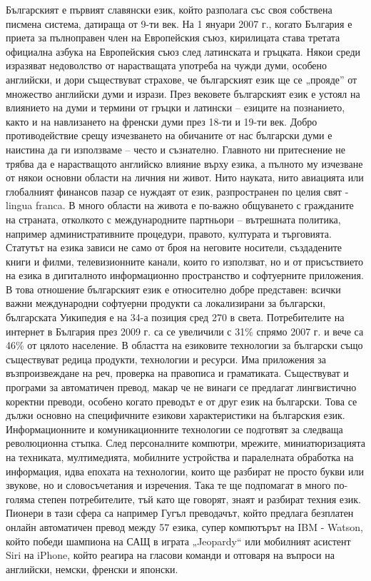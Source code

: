 \begin{multicols}{2}
Българският е първият славянски език, който разполага със своя собствена писмена система, датираща от 9-ти век. На 1 януари 2007 г., когато България е приета за пълноправен член на Европейския съюз, кирилицата става третата официална азбука на Европейския съюз след латинската и гръцката. 
Някои среди изразяват недоволство от нарастващата употреба на чужди думи, особено английски, и дори съществуват страхове, че българският език ще се „прояде” от множество английски думи и изрази. През вековете българският език е устоял на влиянието на думи и термини от гръцки и латински – езиците на познанието, както и на навлизането на френски думи през 18-ти и 19-ти век. Добро противодействие срещу изчезването на обичаните от нас български думи е наистина да ги използваме – често и съзнателно.
Главното ни притеснение не трябва да е нарастващото английско влияние върху езика, а пълното му изчезване от някои основни области на личния ни живот. Нито науката, нито авиацията или глобалният финансов пазар се нуждаят от език, разпространен по целия свят -  lingua franca. В много области на живота е по-важно общуването с гражданите на страната, отколкото с международните партньори – вътрешната политика, например административните процедури, правото, културата и търговията. Статутът на езика зависи не само от броя на неговите носители, създадените книги и филми, телевизионните канали, които го използват, но и от присъствието на езика в дигиталното информационно пространство и софтуерните приложения.
В това отношение българският език е относително добре представен: всички важни международни софтуерни продукти са локализирани за български, българската Уикипедия е на 34-а  позиция сред 270 в света. Потребителите на интернет в България през 2009 г. са се увеличили с 31\% спрямо 2007 г. и вече са 46\% от цялото население.
В областта на езиковите технологии за български също съществуват редица продукти, технологии и ресурси. Има приложения за възпроизвеждане на реч, проверка на правописа и граматиката. Съществуват и програми за автоматичен превод, макар че не винаги се предлагат лингвистично коректни преводи, особено когато преводът е от друг език на  български. Това се дължи основно на специфичните езикови характеристики на българския език.
Информационните и комуникационните технологии се подготвят за следваща революционна стъпка. След персоналните компютри, мрежите, миниатюризацията на техниката, мултимедията,  мобилните устройства и паралелната обработка на информация, идва епохата на технологии, които ще разбират не просто букви или звукове, но и словосъчетания и изречения. Така те ще подпомагат в много по-голяма степен потребителите, тъй като ще говорят, знаят и разбират техния език. Пионери в тази сфера са например Гугъл преводачът, който предлага безплатен онлайн автоматичен превод между 57 езика, супер компютърът на IBM - Watson, който победи шампиона на САЩ в играта „Jeopardy“ или мобилният асистент Siri на iPhone, който реагира на гласови команди и отговаря на въпроси на английски, немски, френски и японски.\\

\end{multicols}
